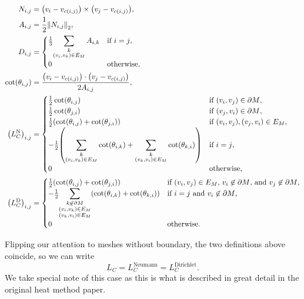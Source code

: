 \begin{align*}
	N_{i, j} &= \pof{v_i - v_{c\pof{i, j}}} \times \pof{v_j - v_{c\pof{i, j}}}, \\
	A_{i, j} &= \frac{1}{2}\norm{N_{i, j}}_2, \\
	D_{i, j} &= \begin{cases}
		\frac{1}{3}{\displaystyle\sum_{\substack{k \\ \pof{v_i, v_k} \in E_M}}A_{i, k}} & \text{if \(i = j\)}, \\
		0 & \text{otherwise},
	\end{cases} \\
	\cot\pof{\theta_{i, j}} &= \frac{\pof{v_i - v_{c\pof{i, j}}} \cdot \pof{v_j - v_{c\pof{i, j}}}}{2A_{i, j}}, \\
	\pof{L_C^{\text{N}}}_{i, j} &= \begin{cases}
		\frac{1}{2}\cot\pof{\theta_{i, j}} & \text{if \(\pof{v_i, v_j} \in \partial M\)}, \\
		\frac{1}{2}\cot\pof{\theta_{j, i}} & \text{if \(\pof{v_j, v_i} \in \partial M\)}, \\
		\frac{1}{2}\pof{\cot\pof{\theta_{i, j}} + \cot\pof{\theta_{j, i}}} & \text{if \(\pof{v_i, v_j}, \pof{v_j, v_i} \in E_M\)}, \\
		-\frac{1}{2}\pof{\displaystyle\sum_{\substack{k \\ \pof{v_i, v_k} \in E_M}}\cot\pof{\theta_{i, k}} + \sum_{\substack{k \\ \pof{v_k, v_i} \in E_M}}\cot\pof{\theta_{k, i}}} & \text{if \(i = j\)}, \\
		0 & \text{otherwise},
	\end{cases} \\
	\pof{L_C^{\text{D}}}_{i, j} &= \begin{cases}
		\frac{1}{2}\pof{\cot\pof{\theta_{i, j}} + \cot\pof{\theta_{j, i}}} & \text{if \(\pof{v_i, v_j} \in E_M\), \(v_i \not\in \partial M\), and \(v_j \not\in \partial M\)}, \\
		-\frac{1}{2}{\displaystyle\sum_{\substack{k \not\in \partial M \\ \pof{v_i, v_k} \in E_M \\ \pof{v_k, v_i} \in E_M}}\pof{\cot\pof{\theta_{i, k}} + \cot\pof{\theta_{k, i}}}} & \text{if \(i = j\) and \(v_i \not\in \partial M\)}, \\
		0 & \text{otherwise}.
	\end{cases}
\end{align*}

Flipping our attention to meshes without boundary, the two definitions above coincide, so we can write \[L_C = L_C^{\text{Neumann}} = L_C^{\text{Dirichlet}}.\] We take special note of this case as this is what is described in great detail in the original heat method paper.

